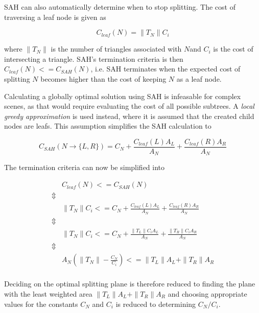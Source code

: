 
SAH can also automatically determine when to stop splitting. The cost
of traversing a leaf node is given as

\begin{displaymath}
  C_{leaf}(N) = \|T_N\| C_i
\end{displaymath}

where $\|T_N\|$ is the number of triangles associated with $N$and $C_i$ is the
cost of intersecting a triangle. SAH's termination criteria is then $C_{leaf}(N)
<= C_{SAH}(N)$, i.e. SAH terminates when the expected cost of splitting $N$
becomes higher than the cost of keeping $N$ as a leaf node.

Calculating a globally optimal solution using SAH is infeasable for
complex scenes, as that would require evaluating the cost of all
possible subtrees. A \textit{local greedy approximation} is used
instead, where it is assumed that the created child nodes are
leafs. This assumption simplifies the SAH calculation to

\begin{displaymath}
  C_{SAH}(N \rightarrow \{L, R\}) = C_N + \frac{C_{leaf}(L) A_L}{A_N}
  + \frac{C_{leaf}(R) A_R}{A_N}
\end{displaymath}

The termination criteria can now be simplified into

\begin{displaymath}
  \begin{array}{rl}
    & C_{leaf}(N) <= C_{SAH}(N)\\
    \Updownarrow \\
    & \|T_N\| C_i <= C_N + \frac{C_{leaf}(L) A_L}{A_N} + \frac{C_{leaf}(R)
      A_R}{A_N} \\
    \Updownarrow \\
    & \|T_N\| C_i <= C_N + \frac{\|T_L\| C_i A_L}{A_N} + \frac{\|T_R\| C_i A_R}{A_N}\\
    \Updownarrow \\
    & A_N (\|T_N\| - \frac{C_N}{C_i}) <=  \|T_L\| A_L + \|T_R\| A_R\\
  \end{array}
\end{displaymath}

Deciding on the optimal splitting plane is therefore reduced to finding the
plane with the least weighted area $\|T_L\| A_L + \|T_R\| A_R$ and choosing
appropriate values for the constants $C_N$ and $C_i$ is reduced to determining
$C_N/C_i$.

